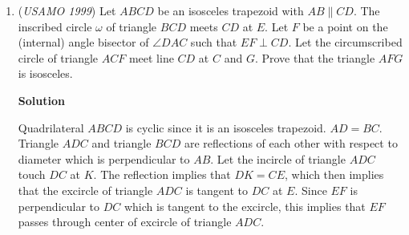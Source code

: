 \begin{enumerate}
 
            \begin{itemize}
        \item If he can complete SOS on his turn, he does so.
        \item Otherwise, since there are an odd number of empty squares at the beginning of his turn, there must be either one empty square surrounded by two filled squares or one empty square surrounded by two empty squares. In both cases, the player places an O in that square. In both situations, it is easy to verify that the first player cannot win on the next turn.
            \end{itemize}
            Eventually, assuming the second player has not won yet (and since the first player does not have a winning opportunity yet), this algorithm must stop. It follows that all of the empty squares are now in pairs. Since there are an even number of empty squares, it is the first player's turn. If the first player plays on one of any pair of empty squares that does not have Ss on both its sides, then the second player plays any letter in the other square of the pair. Then, we will only have pairs of empty squares with Ss on both sides remaining (since from the first moves we have constructed at least one, and no one has played between them otherwise the game will have ended), and the first player will have to play between them, so that the second player will win.  

 


	\item (\textit{USAMO 1999}) Let $ABCD$ be an isosceles trapezoid with $AB \parallel CD$. The inscribed circle $\omega$ of triangle $BCD$ meets $CD$ at $E$. Let $F$ be a point on the (internal) angle bisector of $\angle DAC$ such that $EF \perp CD$. Let the circumscribed circle of triangle $ACF$ meet line $CD$ at $C$ and $G$. Prove that the triangle $AFG$ is isosceles.


 



\textbf{Solution}

Quadrilateral $ABCD$ is cyclic since it is an isosceles trapezoid. $AD=BC$. Triangle $ADC$ and triangle $BCD$ are reflections of each other with respect to diameter which is perpendicular to $AB$. Let the incircle of triangle $ADC$ touch $DC$ at $K$. The reflection implies that $DK=CE$, which then implies that the excircle of triangle $ADC$ is tangent to $DC$ at $E$. Since $EF$ is perpendicular to $DC$ which is tangent to the excircle, this implies that $EF$ passes through center of excircle of triangle $ADC$.


\end{enumerate}
